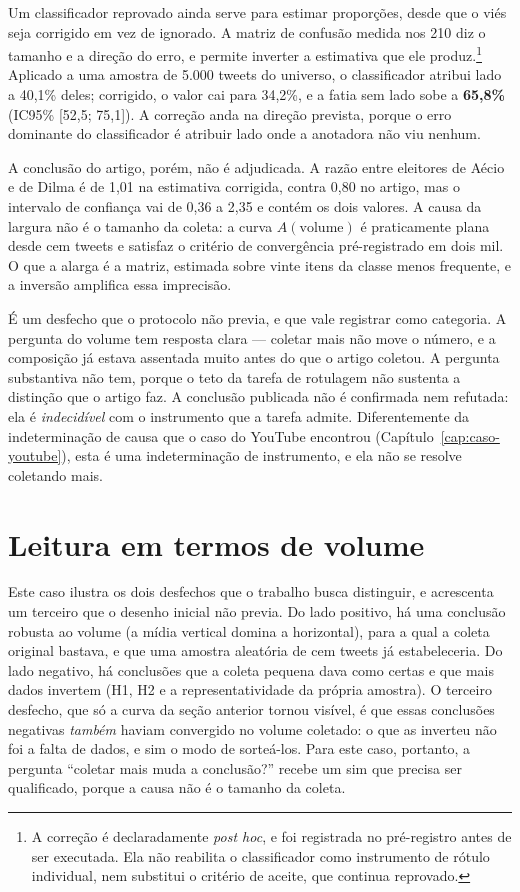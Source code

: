 Um classificador reprovado ainda serve para estimar proporções, desde que o viés seja
corrigido em vez de ignorado. A matriz de confusão medida nos 210 diz o tamanho e a
direção do erro, e permite inverter a estimativa que ele produz.\footnote{A correção
é declaradamente \emph{post hoc}, e foi registrada no pré-registro antes de ser
executada. Ela não reabilita o classificador como instrumento de rótulo individual,
nem substitui o critério de aceite, que continua reprovado.} Aplicado a uma amostra
de 5.000 tweets do universo, o classificador atribui lado a 40,1\% deles; corrigido,
o valor cai para 34,2\%, e a fatia sem lado sobe a \textbf{65,8\%} (IC95\%
[52,5; 75,1]). A correção anda na direção prevista, porque o erro dominante do
classificador é atribuir lado onde a anotadora não viu nenhum.

A conclusão do artigo, porém, não é adjudicada. A razão entre eleitores de Aécio e de
Dilma é de 1,01 na estimativa corrigida, contra 0,80 no artigo, mas o intervalo de
confiança vai de 0,36 a 2,35 e contém os dois valores. A causa da largura não é o
tamanho da coleta: a curva $A(\text{volume})$ é praticamente plana desde cem tweets e
satisfaz o critério de convergência pré-registrado em dois mil. O que a alarga é a
matriz, estimada sobre vinte itens da classe menos frequente, e a inversão amplifica
essa imprecisão.

É um desfecho que o protocolo não previa, e que vale registrar como categoria. A
pergunta do volume tem resposta clara --- coletar mais não move o número, e a
composição já estava assentada muito antes do que o artigo coletou. A pergunta
substantiva não tem, porque o teto da tarefa de rotulagem não sustenta a distinção que
o artigo faz. A conclusão publicada não é confirmada nem refutada: ela é
\emph{indecidível} com o instrumento que a tarefa admite. Diferentemente da
indeterminação de causa que o caso do YouTube encontrou
(Capítulo~\ref{cap:caso-youtube}), esta é uma indeterminação de instrumento, e ela não
se resolve coletando mais.

\section{Leitura em termos de volume}

Este caso ilustra os dois desfechos que o trabalho busca distinguir, e acrescenta um
terceiro que o desenho inicial não previa. Do lado
positivo, há uma conclusão robusta ao volume (a mídia vertical domina a
horizontal), para a qual a coleta original bastava, e que uma amostra aleatória de
cem tweets já estabeleceria. Do lado negativo, há
conclusões que a coleta pequena dava como certas e que mais dados invertem (H1,
H2 e a representatividade da própria amostra). O terceiro desfecho, que só a curva
da seção anterior tornou visível, é que essas conclusões negativas \emph{também}
haviam convergido no volume coletado: o que as inverteu não foi a falta de dados, e
sim o modo de sorteá-los. Para este caso, portanto, a pergunta ``coletar mais muda a
conclusão?'' recebe um sim que precisa ser qualificado, porque a causa não é o
tamanho da coleta.

